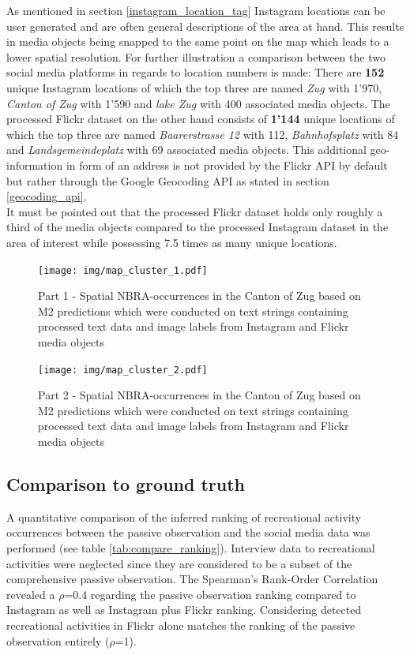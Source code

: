 As mentioned in section \ref{instagram_location_tag} Instagram locations can be user generated and are often general descriptions of the area at hand. This results in media objects being snapped to the same point on the map which leads to a lower spatial resolution. For further illustration a comparison between the two social media platforms in regards to location numbers is made:
There are \textbf{152} unique Instagram locations of which the top three are named \textit{Zug} with 1'970, \textit{Canton of Zug} with 1'590 and \textit{lake Zug} with 400 associated media objects.
The processed Flickr dataset on the other hand consists of \textbf{1'144} unique locations of which the top three are named \textit{Baarerstrasse 12} with 112, \textit{Bahnhofsplatz} with 84 and \textit{Landsgemeindeplatz} with 69 associated media objects. This additional geo-information in form of an address is not provided by the Flickr API by default but rather through the Google Geocoding API as stated in section \ref{geocoding_api}. \\
It must be pointed out that the processed Flickr dataset holds only roughly a third of the media objects compared to the processed Instagram dataset in the area of interest while possessing 7.5 times as many unique locations. 

\begin{figure}[h!]
   \centering
   \texttt{[image: img/map\_cluster\_1.pdf]}
   \caption{Part 1 - Spatial NBRA-occurrences in the Canton of Zug based on M2 predictions which were conducted on text strings containing processed text data and image labels from Instagram and Flickr media objects}
   \label{fig:map_cluster_1}
\end{figure}

\begin{figure}[h!]
   \centering
   \texttt{[image: img/map\_cluster\_2.pdf]}
   \caption{Part 2 - Spatial NBRA-occurrences in the Canton of Zug based on M2 predictions which were conducted on text strings containing processed text data and image labels from Instagram and Flickr media objects}
   \label{fig:map_cluster_2}
\end{figure}

\subsection{Comparison to ground truth} \label{results_comp_ground_truth}
A quantitative comparison of the inferred ranking of recreational activity occurrences between the passive observation and the social media data was performed (see table \ref{tab:compare_ranking}). Interview data to recreational activities were neglected since they are considered to be a subset of the comprehensive passive observation. The Spearman's Rank-Order Correlation revealed a $\rho$=0.4 regarding the passive observation ranking compared to Instagram as well as Instagram plus Flickr ranking. Considering detected recreational activities in Flickr alone matches the ranking of the passive observation entirely ($\rho$=1). \\

